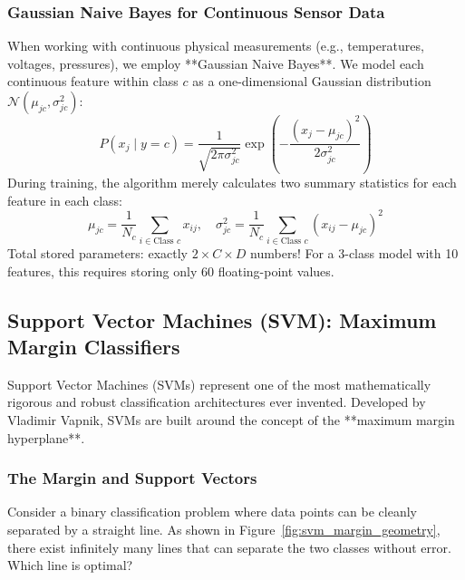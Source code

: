 \subsubsection{Gaussian Naive Bayes for Continuous Sensor Data}
When working with continuous physical measurements (e.g., temperatures, voltages, pressures), we employ **Gaussian Naive Bayes**. We model each continuous feature within class $c$ as a one-dimensional Gaussian distribution $\mathcal{N}(\mu_{jc}, \sigma_{jc}^2)$:
\begin{equation}
P(x_j \mid y = c) = \frac{1}{\sqrt{2\pi \sigma_{jc}^2}} \exp\left( -\frac{(x_j - \mu_{jc})^2}{2\sigma_{jc}^2} \right)\label{eq:gaussian_nb_likelihood}
\end{equation}
During training, the algorithm merely calculates two summary statistics for each feature in each class:
\begin{equation}
\mu_{jc} = \frac{1}{N_c} \sum_{i \in \text{Class } c} x_{ij}, \quad \sigma_{jc}^2 = \frac{1}{N_c} \sum_{i \in \text{Class } c} (x_{ij} - \mu_{jc})^2
\end{equation}
Total stored parameters: exactly $2 \times C \times D$ numbers! For a 3-class model with 10 features, this requires storing only $60$ floating-point values.

\subsection{Support Vector Machines (SVM): Maximum Margin Classifiers}\label{subsec:svm}

Support Vector Machines (SVMs) represent one of the most mathematically rigorous and robust classification architectures ever invented. Developed by Vladimir Vapnik, SVMs are built around the concept of the **maximum margin hyperplane**.

\subsubsection{The Margin and Support Vectors}
Consider a binary classification problem where data points can be cleanly separated by a straight line. As shown in Figure~\ref{fig:svm_margin_geometry}, there exist infinitely many lines that can separate the two classes without error. Which line is optimal?

